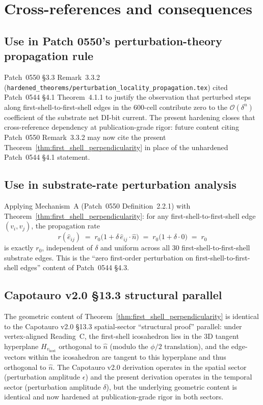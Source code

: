 \documentclass[11pt,letterpaper]{article}
\newcommand{\nhat}{\hat{n}}
\newcommand{\vhost}{v_{\text{host}}}
\newcommand{\Hperp}{H_{\vhost}}
\begin{document}
\section{Cross-references and consequences}\label{sec:cross_references}

\subsection{Use in Patch 0550's perturbation-theory propagation rule}\label{sec:use_in_0550}

Patch~0550 \S3.3 Remark~3.3.2 (\texttt{hardened\_theorems/perturbation\_locality\_propagation.tex}) cited Patch~0544 \S4.1 Theorem~4.1.1 to justify the observation that perturbed steps along first-shell-to-first-shell edges in the 600-cell contribute zero to the $\mathcal{O}(\delta^n)$ coefficient of the substrate net DI-bit current. The present hardening closes that cross-reference dependency at publication-grade rigor: future content citing Patch~0550 Remark~3.3.2 may now cite the present Theorem~\ref{thm:first_shell_perpendicularity} in place of the unhardened Patch~0544 \S4.1 statement.

\subsection{Use in substrate-rate perturbation analysis}\label{sec:use_in_substrate_rate}

Applying Mechanism~A (Patch~0550 Definition~2.2.1) with Theorem~\ref{thm:first_shell_perpendicularity}: for any first-shell-to-first-shell edge $(v_i, v_j)$, the propagation rate
\begin{equation*}
r(\hat{e}_{ij}) \;=\; r_0\bigl(1 + \delta\,\hat{e}_{ij}\cdot\nhat\bigr) \;=\; r_0\bigl(1 + \delta\cdot 0\bigr) \;=\; r_0
\end{equation*}
is exactly $r_0$, independent of $\delta$ and uniform across all 30 first-shell-to-first-shell substrate edges. This is the ``zero first-order perturbation on first-shell-to-first-shell edges'' content of Patch~0544 \S4.3.

\subsection{Capotauro v2.0 §13.3 structural parallel}\label{sec:capotauro_parallel}

The geometric content of Theorem~\ref{thm:first_shell_perpendicularity} is identical to the Capotauro v2.0 \S13.3 spatial-sector ``structural proof'' parallel: under vertex-aligned Reading~C, the first-shell icosahedron lies in the 3D tangent hyperplane $\Hperp$ orthogonal to $\nhat$ (modulo the $\phi/2$ translation), and the edge-vectors within the icosahedron are tangent to this hyperplane and thus orthogonal to $\nhat$. The Capotauro v2.0 derivation operates in the spatial sector (perturbation amplitude $\epsilon$) and the present derivation operates in the temporal sector (perturbation amplitude $\delta$), but the underlying geometric content is identical and now hardened at publication-grade rigor in both sectors.
\end{document}
